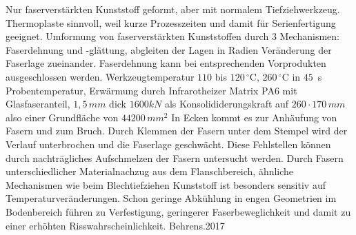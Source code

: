 Nur faserverstärkten Kunststoff geformt, aber mit normalem Tiefziehwerkzeug.
Thermoplaste sinnvoll, weil kurze Prozesszeiten und damit für Serienfertigung geeignet.
Umformung von faserverstärkten Kunststoffen durch 3 Mechanismen: Faserdehnung und -glättung, abgleiten der Lagen in Radien Veränderung der Faserlage zueinander.
Faserdehnung kann bei entsprechenden Vorprodukten ausgeschlossen werden.
Werkzeugtemperatur $110$ bis $120 \, ^\circ \text{C}$, $260 \, ^\circ \text{C}$ in $45\,$ s Probentemperatur, Erwärmung durch Infrarotheizer
Matrix PA6 mit Glasfaseranteil, $1,5\, mm$ dick
$1600 kN$ als Konsolididerungskraft auf $260 \cdot 170 \, mm$ also einer Grundfläche von $44200 \, mm^2$
In Ecken kommt es zur Anhäufung von Fasern und zum Bruch.
Durch Klemmen der Fasern unter dem Stempel wird der Verlauf unterbrochen und die Faserlage geschwächt.
Diese Fehlstellen können durch nachträgliches Aufschmelzen der Fasern untersucht werden.
Durch Fasern unterschiedlicher Materialnachzug aus dem Flanschbereich, ähnliche Mechanismen wie beim Blechtiefziehen
Kunststoff ist besonders sensitiv auf Temperaturveränderungen.
Schon geringe Abkühlung in engen Geometrien im Bodenbereich führen zu Verfestigung, geringerer Faserbeweglichkeit und damit zu einer erhöhten Risswahrscheinlichkeit.
Behrens.2017

